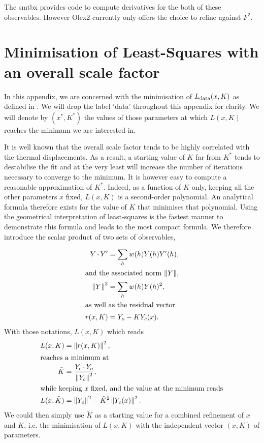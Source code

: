 \documentclass[pdf]{iucr}
\begin{document}
The smtbx provides code to compute derivatives for the both of these observables. However Olex2 currently only offers the choice to refine against $F^2$.

\section{Minimisation of Least-Squares with an overall scale factor}
\label{appendix:leastsquaresminimisation}

In this appendix, we are concerned with the minimisation of $L_{\text{data}}(x, K)$ as defined in . We will drop the label `data' throughout this appendix for clarity. We will denote by $(x^*, K^*)$ the values of those parameters at which $L(x,K)$ reaches the minimum we are interested in.

It is well known that the overall scale factor tends to be highly correlated with the thermal displacements. As a result, a starting value of $K$ far from $K^*$ tends to destabilise the fit and at the very least will increase the number of iterations necessary to converge to the minimum. It is however easy to compute a reasonable approximation of $K^*$. Indeed, as a function of $K$ only, keeping all the other parameters $x$ fixed, $L(x, K)$ is a second-order polynomial. An analytical formula therefore exists for the value of $K$ that minimises that polynomial. Using the geometrical interpretation of least-squares is the fastest manner to demonstrate this formula and leads to the most compact formula. We therefore introduce the scalar product of two sets of observables,

\begin{align}
Y \operatorname{\cdot} Y' &= \sum_h w(h) Y(h) Y'(h), \\
\intertext{and the associated norm $\left\| Y \right\|$,}
\left\| Y \right\|^2 &= \sum_h w(h) Y(h)^2, \\
\intertext{as well as the residual vector}
r(x, K) &= Y_o - K Y_c(x).
\label{eqn:lsresidualdef}
\end{align}
With those notations, $L(x, K)$ which reads
\begin{align}
L(x, K) &= \left\| r(x, K) \right\|^2, \\
\intertext{reaches a minimum at}
\tilde{K} &= \frac{Y_c \operatorname{\cdot} Y_o}{\left\| Y_c \right\|^2},
\label{eqn:tildeK}
\\
\intertext{while keeping $x$ fixed, and the value at the minimum reads}
L(x, \tilde{K}) &= \left\| Y_o \right\|^2 - \tilde{K}^2 \left\| Y_c(x) \right\|^2.
\end{align}
We could then simply use $\tilde{K}$ as a starting value for a combined refinement of $x$ and $K$, i.e. the minimisation of $L(x, K)$ with the independent vector $(x, K)$ of parameters.
\end{document}
